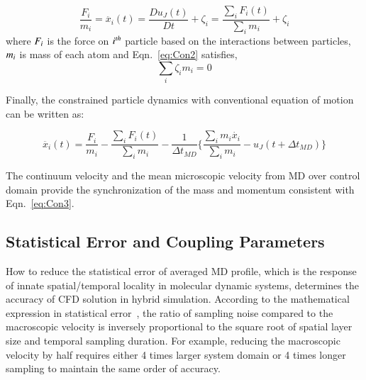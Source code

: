 \documentclass[preprint,12pt]{elsarticle}
\begin{document}
\vspace{-.2em}
\begin{equation}
 \frac{F_{i}}{m_{i}} = \ddot{x_{i}}(t)  =   \frac{Du_{J}(t)}{Dt} + \zeta_{i} = \frac{\displaystyle\sum_{i}F_{i}(t)} {\displaystyle\sum_{i}m_{i}} +   \zeta_{i}
 \label{eq:Con2}
\end{equation}
\normalsize
where $\it F_{i}$ is the force on $\it i^{th}$ particle based on the interactions between particles,  $\it m_{i}$ is mass of each atom and  Eqn.~\ref{eq:Con2} satisfies,
\vspace{-.2em}
\begin{equation}
\displaystyle\sum_{i}\zeta_{i}m_{i} = 0
 \label{eq:Con2}
\end{equation}
\normalsize

Finally, the constrained particle dynamics with conventional equation of motion can be written as:

\vspace{-.2em}
\begin{equation}
 \ddot{x_{i}}(t) = \frac{F_{i}}{m_{i}} -  \frac{\displaystyle\sum_{i}F_{i}(t)} {\displaystyle\sum_{i}m_{i}} - \frac{1}{\Delta t_{MD}} \{  \frac{\displaystyle\sum_{i}m_{i}\dot{x_{i}}} {\displaystyle\sum_{i}m_{i}} - u_{J}(t + \Delta t_{MD})\}
 \label{eq:Con3}
\end{equation}
\normalsize

The continuum velocity and the mean microscopic velocity from MD over control domain provide the synchronization of the mass and momentum consistent with Eqn.~\ref{eq:Con3}.


\subsection{Statistical Error and Coupling Parameters}
\label{sec:numerical_noise}


How to reduce the statistical error of averaged MD profile, which is the response of innate spatial/temporal locality in molecular dynamic systems, determines the accuracy of CFD solution in hybrid simulation. According to the mathematical expression in statistical error~\cite{Hadjicon3,Time_Mechanism}, the ratio of sampling noise compared to the macroscopic velocity is inversely proportional to the square root of spatial layer size and temporal sampling duration. For example, reducing the macroscopic velocity by half requires either 4 times larger system domain or 4 times longer sampling to maintain the same order of accuracy.
\end{document}
